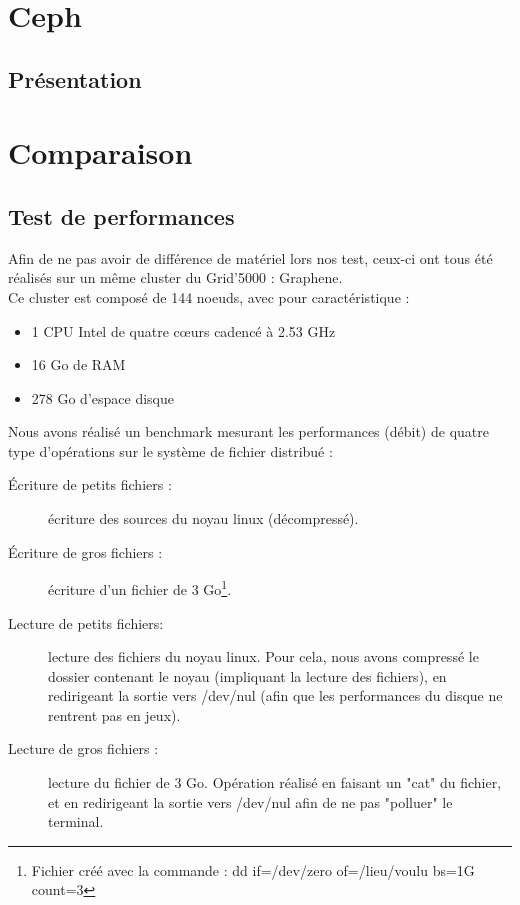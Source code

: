\documentclass[12pt]{report}
\begin{document}
	\chapter{Ceph}
		\section{Présentation}

	\chapter{Comparaison}
		\section{Test de performances}
			Afin de ne pas avoir de différence de matériel lors nos test, ceux-ci ont tous été réalisés sur un même cluster du Grid'5000 : Graphene.\\

			Ce cluster est composé de 144 noeuds, avec pour caractéristique :
			\begin{itemize}
				\item 1 CPU Intel de quatre cœurs cadencé à 2.53 GHz
				\item 16 Go de RAM
				\item 278 Go d'espace disque\\
			\end{itemize}

			Nous avons réalisé un benchmark mesurant les performances (débit) de quatre type d'opérations sur le système de fichier distribué :
			\begin{description}
				\item[Écriture de petits fichiers :] écriture des sources du noyau linux (décompressé).
				\item[Écriture de gros fichiers :] écriture d'un fichier de 3 Go\footnote{Fichier créé avec la commande : dd if=/dev/zero of=/lieu/voulu bs=1G count=3}.
				\item[Lecture de petits fichiers: ] lecture des fichiers du noyau linux.
				Pour cela, nous avons compressé le dossier contenant le noyau (impliquant la lecture des fichiers),
				en redirigeant la sortie vers /dev/nul (afin que les performances du disque ne rentrent pas en jeux).
				\item[Lecture de gros fichiers :] lecture du fichier de 3 Go. Opération réalisé en faisant un "cat" du fichier,
				et en redirigeant la sortie vers /dev/nul afin de ne pas "polluer" le terminal.
			\end{description}
\end{document}
